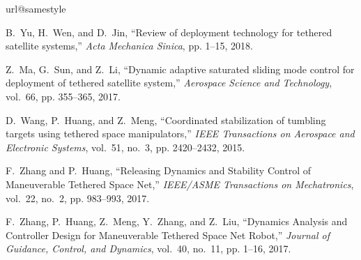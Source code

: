 \documentclass[10pt,onecolumn,draftcls]{IEEEtran}
\begin{document}
%
%
\begin{thebibliography}{10}
	\providecommand{\url}[1]{#1}
	\csname url@samestyle\endcsname
	\providecommand{\newblock}{\relax}
	\providecommand{\bibinfo}[2]{#2}
	\providecommand{\BIBentrySTDinterwordspacing}{\spaceskip=0pt\relax}
	\providecommand{\BIBentryALTinterwordstretchfactor}{4}
	\providecommand{\BIBentryALTinterwordspacing}{\spaceskip=\fontdimen2\font plus
	\BIBentryALTinterwordstretchfactor\fontdimen3\font minus
		\fontdimen4\font\relax}
	\providecommand{\BIBforeignlanguage}[2]{{%
	\expandafter\ifx\csname l@#1\endcsname\relax
	\typeout{** WARNING: IEEEtran.bst: No hyphenation pattern has been}%
	\typeout{** loaded for the language `#1'. Using the pattern for}%
	\typeout{** the default language instead.}%
	\else
	\language=\csname l@#1\endcsname
	\fi
	#2}}
	\providecommand{\BIBdecl}{\relax}
	\BIBdecl
	
	B.~Yu, H.~Wen, and D.~Jin, ``Review of deployment technology for tethered
		satellite systems,'' \emph{Acta Mechanica Sinica}, pp. 1--15, 2018.
	
	Z.~Ma, G.~Sun, and Z.~Li, ``Dynamic adaptive saturated sliding mode control for
		deployment of tethered satellite system,'' \emph{Aerospace Science and
		Technology}, vol.~66, pp. 355--365, 2017.
	
	D.~Wang, P.~Huang, and Z.~Meng, ``Coordinated stabilization of tumbling targets
		using tethered space manipulators,'' \emph{IEEE Transactions on Aerospace and
		Electronic Systems}, vol.~51, no.~3, pp. 2420--2432, 2015.
	
	F.~Zhang and P.~Huang, ``{Releasing Dynamics and Stability Control of
		Maneuverable Tethered Space Net},'' \emph{IEEE/ASME Transactions on
		Mechatronics}, vol.~22, no.~2, pp. 983--993, 2017.
	
	F.~Zhang, P.~Huang, Z.~Meng, Y.~Zhang, and Z.~Liu, ``{Dynamics Analysis and
		Controller Design for Maneuverable Tethered Space Net Robot},'' \emph{Journal
		of Guidance, Control, and Dynamics}, vol.~40, no.~11, pp. 1--16, 2017.
	

\end{thebibliography}
\end{document}
